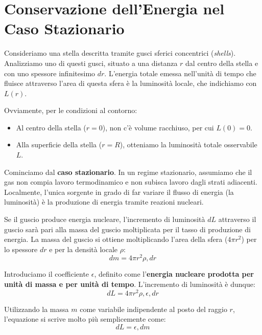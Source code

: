 \section{Conservazione dell'Energia nel Caso Stazionario}

Consideriamo una stella descritta tramite gusci sferici concentrici (\textit{shells}). Analizziamo uno di questi gusci, situato a una distanza $r$ dal centro della stella e con uno spessore infinitesimo $dr$.
L'energia totale emessa nell'unità di tempo che fluisce attraverso l'area di questa sfera è la luminosità locale, che indichiamo con $L(r)$.

Ovviamente, per le condizioni al contorno:
\begin{itemize}
\item Al centro della stella ($r = 0$), non c'è volume racchiuso, per cui $L(0) = 0$.
\item Alla superficie della stella ($r = R$), otteniamo la luminosità totale osservabile $L$.
\end{itemize}

Cominciamo dal \textbf{caso stazionario}. In un regime stazionario, assumiamo che il gas non compia lavoro termodinamico e non subisca lavoro dagli strati adiacenti. Localmente, l'unica sorgente in grado di far variare il flusso di energia (la luminosità) è la produzione di energia tramite reazioni nucleari.

Se il guscio produce energia nucleare, l'incremento di luminosità $dL$ attraverso il guscio sarà pari alla massa del guscio moltiplicata per il tasso di produzione di energia. La massa del guscio si ottiene moltiplicando l'area della sfera ($4 \pi r^2$) per lo spessore $dr$ e per la densità locale $\rho$:
\begin{equation}
dm = 4 \pi r^2 \rho , dr
\end{equation}

Introduciamo il coefficiente $\epsilon$, definito come l'\textbf{energia nucleare prodotta per unità di massa e per unità di tempo}. L'incremento di luminosità è dunque:
\begin{equation}
dL = 4 \pi r^2 \rho , \epsilon , dr
\end{equation}

Utilizzando la massa $m$ come variabile indipendente al posto del raggio $r$, l'equazione si scrive molto più semplicemente come:
\begin{equation}
dL = \epsilon , dm
\end{equation}

